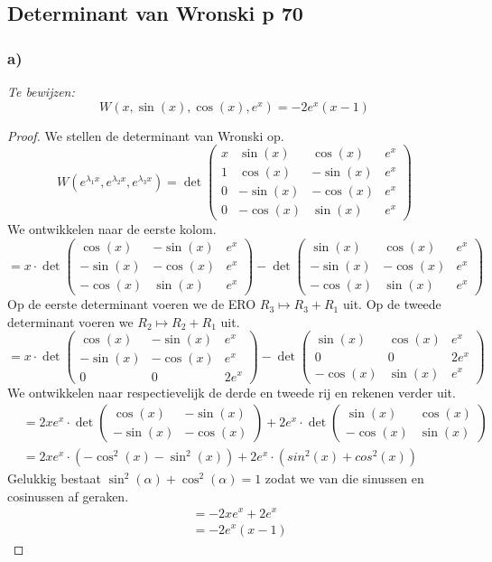 \documentclass[lineaire_algebra_oplossingen.tex]{subfiles}
\begin{document}
\subsection{Determinant van Wronski p 70}
\label{wronski}
\subsubsection*{a)}
\textit{Te bewijzen:}
\[
W(x, \sin(x), \cos(x), e^x) = -2e^x(x-1)
\]
\begin{proof}
We stellen de determinant van Wronski op.
\[
W(e^{\lambda_1x}, e^{\lambda_2x}, e^{\lambda_3x})
= \det
\begin{pmatrix}
x &  \sin(x) &  \cos(x)  & e^x \\
1 &  \cos(x) & -\sin(x) & e^x \\
0 & -\sin(x) & -\cos(x) & e^x \\
0 & -\cos(x) &  \sin(x) & e^x
\end{pmatrix}
\]
We ontwikkelen naar de eerste kolom.
\[
= x \cdot \det
\begin{pmatrix}
\cos(x)  & -\sin(x) & e^x \\
-\sin(x) & -\cos(x) & e^x \\
-\cos(x) &  \sin(x) & e^x
\end{pmatrix}
- \det
\begin{pmatrix}
\sin(x)  &  \cos(x)  & e^x \\
-\sin(x) & -\cos(x) & e^x \\
-\cos(x) &  \sin(x) & e^x
\end{pmatrix}
\]
Op de eerste determinant voeren we de ERO $R_3 \longmapsto R_3 + R_1$ uit. Op de tweede determinant voeren we $R_2 \longmapsto R_2 + R_1$ uit.
\[
= x \cdot \det
\begin{pmatrix}
\cos(x)  & -\sin(x) & e^x \\
-\sin(x) & -\cos(x) & e^x \\
0        &  0       & 2e^x
\end{pmatrix}
- \det
\begin{pmatrix}
\sin(x)  &  \cos(x) & e^x \\
0        & 0        & 2e^x \\
-\cos(x) &  \sin(x) & e^x
\end{pmatrix}
\]
We ontwikkelen naar respectievelijk de derde en tweede rij en rekenen verder uit.
\begin{align*}
&=
2xe^x \cdot \det
\begin{pmatrix}
\cos(x)  & -\sin(x) \\
-\sin(x) & -\cos(x)
\end{pmatrix}
+ 2 e^x \cdot \det
\begin{pmatrix}
\sin(x)  &  \cos(x) \\
-\cos(x) &  \sin(x)
\end{pmatrix} \\
&=
2xe^x \cdot
(-\cos^2(x) - \sin^2(x))
+ 2e^x \cdot
(sin^2(x) + cos^2(x))
\end{align*}
Gelukkig bestaat $\sin^2(\alpha) + \cos^2(\alpha) = 1$ zodat we van die sinussen en cosinussen af geraken.
\begin{align*}
&=
- 2xe^x + 2e^x \\
&=
-2e^x(x-1) 
\end{align*}
\end{proof}
\end{document}
